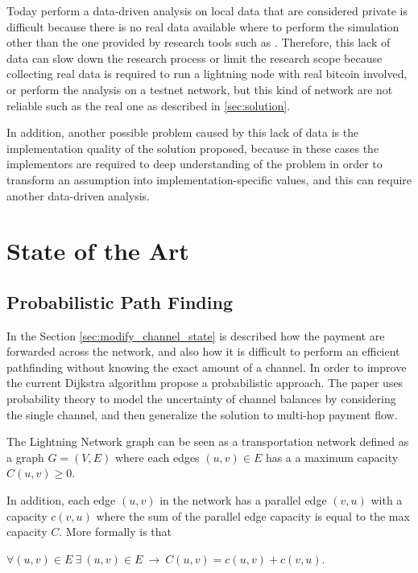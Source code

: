 Today perform a data-driven analysis on local data that are considered private
is difficult because there is no real data available where to perform the simulation
other than the one provided by research tools such as \cite{lngossip}.
Therefore, this lack of data can slow down the research process or limit the 
research scope because collecting real data is required to run a lightning node 
with real bitcoin involved, or perform the analysis on a 
testnet network, but this kind of network are not reliable such as 
the real one as described in \ref{sec:solution}. 

In addition, another possible problem caused by this lack of data is the implementation
quality of the solution proposed, because in these cases 
the implementors are required to deep understanding of the problem 
in order to transform an assumption into implementation-specific values, 
and this can require another data-driven analysis.

\section{State of the Art}

\subsection{Probabilistic Path Finding}

In the Section \ref{sec:modify_channel_state} is described how the payment are
forwarded across the network, and also how it is difficult to perform an efficient 
pathfinding without knowing the exact amount of a channel. 
In order to improve the current Dijkstra algorithm \cite{DBLP:journals/corr/abs-2103-08576}
propose a probabilistic approach.
The paper \cite{DBLP:journals/corr/abs-2103-08576} uses probability theory to 
model the uncertainty of channel balances by considering the single channel, 
and then generalize the solution to multi-hop payment flow.

The Lightning Network graph can be seen as a transportation network 
defined as a graph $G = (V, E)$ where each edges $(u, v) \in E$ has a 
a maximum capacity $C(u, v) \ge 0$.

In addition, each edge $(u, v)$ in the network has a parallel edge $(v, u)$ 
with a capacity $c(v, u)$ where the sum of the parallel edge capacity is
equal to the max capacity $C$. More formally is that 

\begin{center}
    $\forall (u, v) \in E \: \exists \: (u, v) \in E \: \rightarrow \: C(u, v) = c(u, v) + c(v, u)$.
\end{center}

